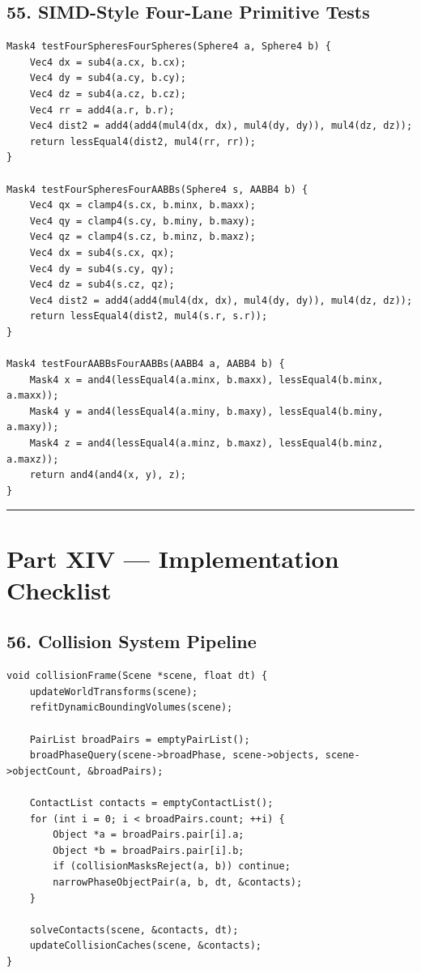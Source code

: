 \documentclass[10pt,letterpaper]{article}
\begin{document}
\subsection*{55. SIMD-Style Four-Lane Primitive Tests}

\begin{verbatim}
Mask4 testFourSpheresFourSpheres(Sphere4 a, Sphere4 b) {
    Vec4 dx = sub4(a.cx, b.cx);
    Vec4 dy = sub4(a.cy, b.cy);
    Vec4 dz = sub4(a.cz, b.cz);
    Vec4 rr = add4(a.r, b.r);
    Vec4 dist2 = add4(add4(mul4(dx, dx), mul4(dy, dy)), mul4(dz, dz));
    return lessEqual4(dist2, mul4(rr, rr));
}

Mask4 testFourSpheresFourAABBs(Sphere4 s, AABB4 b) {
    Vec4 qx = clamp4(s.cx, b.minx, b.maxx);
    Vec4 qy = clamp4(s.cy, b.miny, b.maxy);
    Vec4 qz = clamp4(s.cz, b.minz, b.maxz);
    Vec4 dx = sub4(s.cx, qx);
    Vec4 dy = sub4(s.cy, qy);
    Vec4 dz = sub4(s.cz, qz);
    Vec4 dist2 = add4(add4(mul4(dx, dx), mul4(dy, dy)), mul4(dz, dz));
    return lessEqual4(dist2, mul4(s.r, s.r));
}

Mask4 testFourAABBsFourAABBs(AABB4 a, AABB4 b) {
    Mask4 x = and4(lessEqual4(a.minx, b.maxx), lessEqual4(b.minx, a.maxx));
    Mask4 y = and4(lessEqual4(a.miny, b.maxy), lessEqual4(b.miny, a.maxy));
    Mask4 z = and4(lessEqual4(a.minz, b.maxz), lessEqual4(b.minz, a.maxz));
    return and4(and4(x, y), z);
}
\end{verbatim}

\medskip\hrule\medskip


\clearpage
{}
\section*{Part XIV --- Implementation Checklist}


\subsection*{56. Collision System Pipeline}

\begin{verbatim}
void collisionFrame(Scene *scene, float dt) {
    updateWorldTransforms(scene);
    refitDynamicBoundingVolumes(scene);

    PairList broadPairs = emptyPairList();
    broadPhaseQuery(scene->broadPhase, scene->objects, scene->objectCount, &broadPairs);

    ContactList contacts = emptyContactList();
    for (int i = 0; i < broadPairs.count; ++i) {
        Object *a = broadPairs.pair[i].a;
        Object *b = broadPairs.pair[i].b;
        if (collisionMasksReject(a, b)) continue;
        narrowPhaseObjectPair(a, b, dt, &contacts);
    }

    solveContacts(scene, &contacts, dt);
    updateCollisionCaches(scene, &contacts);
}
\end{verbatim}
\end{document}
